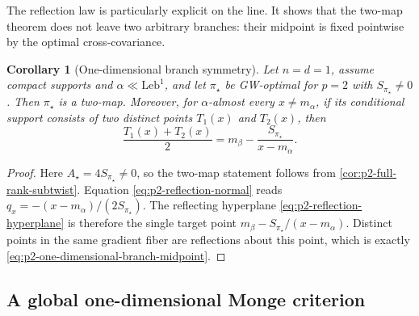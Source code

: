 \documentclass[11pt,a4paper]{article}
\newtheorem{corollary}[theorem]{Corollary}
\theoremstyle{definition}
\theoremstyle{remark}
\begin{document}
The reflection law is particularly explicit on the line.  It shows that the
two-map theorem does not leave two arbitrary branches: their midpoint is fixed
pointwise by the optimal cross-covariance.

\begin{corollary}[One-dimensional branch symmetry]
\label{cor:p2-one-dimensional-branch-symmetry}
Let \(n=d=1\), assume compact supports and
\(\alpha\ll\mathrm{Leb}^1\), and let \(\pi_\star\) be GW-optimal for \(p=2\)
with \(S_{\pi_\star}\ne0\).  Then \(\pi_\star\) is a two-map.  Moreover, for
\(\alpha\)-almost every \(x\ne m_\alpha\), if its conditional support consists
of two distinct points \(T_1(x)\) and \(T_2(x)\), then
\begin{equation}
  \frac{T_1(x)+T_2(x)}2
  =m_\beta-\frac{S_{\pi_\star}}{x-m_\alpha}.
  \label{eq:p2-one-dimensional-branch-midpoint}
\end{equation}
\end{corollary}

\begin{proof}
Here \(A_\star=4S_{\pi_\star}\ne0\), so the two-map statement follows from
\cref{cor:p2-full-rank-subtwist}.  Equation \eqref{eq:p2-reflection-normal} reads
\(
 q_x=-(x-m_\alpha)/(2S_{\pi_\star})
\).
The reflecting hyperplane \eqref{eq:p2-reflection-hyperplane} is therefore the
single target point
\(
 m_\beta-S_{\pi_\star}/(x-m_\alpha)
\).
Distinct points in the same gradient fiber are reflections about this point,
which is exactly \eqref{eq:p2-one-dimensional-branch-midpoint}.
\end{proof}

\subsection{A global one-dimensional Monge criterion}
\end{document}
